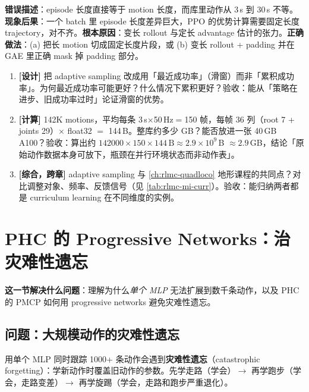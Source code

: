 \begin{pitfall}
\textbf{错误描述}：episode 长度直接等于 motion 长度，而库里动作从 3\,s 到 30\,s 不等。\textbf{现象后果}：一个 batch 里 episode 长度差异巨大，PPO 的优势计算需要固定长度 trajectory，对不齐。\textbf{根本原因}：变长 rollout 与定长 advantage 估计的张力。\textbf{正确做法}：(a) 把长 motion 切成固定长度片段，或 (b) 变长 rollout + padding 并在 GAE 里正确 mask 掉 padding 部分。
\end{pitfall}

\begin{practice}[本节练习]
\begin{enumerate}
  \item \textbf{[设计]} 把 adaptive sampling 改成用「最近成功率」（滑窗）而非「累积成功率」。为何最近成功率可能更好？什么情况下累积更好？验收：能从「策略在进步、旧成功率过时」论证滑窗的优势。
  \item \textbf{[计算]} 142K motions，平均每条 3\,s$\times$50\,Hz$=$150 帧，每帧 36 列（root 7 + joints 29）$\times$ float32 $=$ 144\,B。整库约多少 GB？能否放进一张 40\,GB A100？验收：算出约 $142000\times150\times144\,\text{B}\approx 2.9\times10^{9}$\,B $\approx 2.9$\,GB，结论「原始动作数据本身可放下，瓶颈在并行环境状态而非动作表」。
  \item \textbf{[综合，跨章]} adaptive sampling 与 \cref{ch:rlmc-quadloco} 地形课程的共同点？对比调整对象、频率、反馈信号（见 \cref{tab:rlmc-mi-curr}）。验收：能归纳两者都是 curriculum learning 在不同维度的实例。
\end{enumerate}
\end{practice}

\section{PHC 的 Progressive Networks：治灾难性遗忘}
\label{sec:rlmc-mi-phc}

\textbf{这一节解决什么问题}：理解为什么\emph{单个 MLP} 无法扩展到数千条动作，以及 PHC 的 PMCP 如何用 progressive networks 避免灾难性遗忘。

\subsection{问题：大规模动作的灾难性遗忘}
\label{sec:rlmc-mi-phc-problem}

用单个 MLP 同时跟踪 1000+ 条动作会遇到\textbf{灾难性遗忘}（catastrophic forgetting）：学新动作时覆盖旧动作的参数。先学走路（学会）$\to$ 再学跑步（学会，走路变差）$\to$ 再学旋踢（学会，走路和跑步严重退化）。

